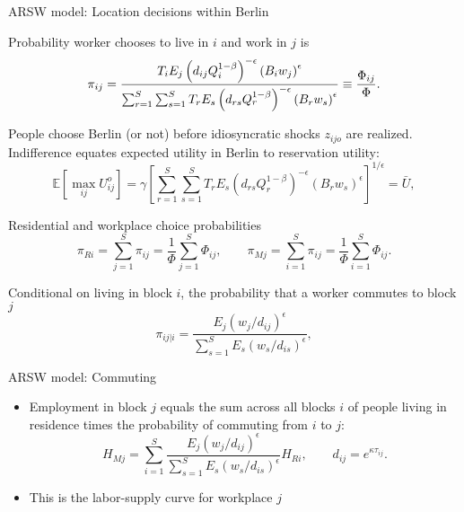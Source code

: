 \documentclass[11pt,notes=hide,aspectratio=169]{beamer}
\begin{document}
\begin{frame}{ARSW model: Location decisions within Berlin}
\begin{itemize}{\footnotesize
\item Probability worker chooses to live in $i$ and work in $j$ is
\begin{equation*} \label{eq:com_prob}
\pi _{ij}= \frac{T_{i} E_{j} \left( d_{ij}
Q_{i}^{1-\beta} \right)^{-\epsilon} \left( B_{i} w_{j} \right)^{\epsilon}}{%
\sum_{r=1}^{S} \sum_{s=1}^{S} T_{r} E_{s} \left( d_{rs} Q_{r}^{1-\beta}
\right)^{-\epsilon} \left( B_{r} w_{s} \right)^{\epsilon}} \equiv \frac{\Phi_{ij}}{\Phi} .
\end{equation*}
\item People choose Berlin (or not) before idiosyncratic shocks  $z_{ijo}$ are realized.
Indifference equates expected utility in Berlin to reservation utility:
\begin{equation*} \label{eq:pm}
\mathbb{E} \left[\max_{ij} U_{ij}^{o} \right]  = \gamma \left[ \sum_{r=1}^{S} \sum_{s=1}^{S} T_{r} E_{s} \left( d_{rs}
Q_{r}^{1-\beta} \right)^{-\epsilon} \left( B_{r} w_{s} \right)^{\epsilon} %
\right]^{1/\epsilon} = \bar{U},  
\end{equation*}
\item Residential and workplace choice probabilities
\begin{equation*} \label{eq:ch_prob}
\pi_{Ri} = \sum_{j=1}^{S} \pi_{ij} = \frac{1}{\Phi} \sum_{j=1}^{S} \Phi_{ij}, \qquad  \pi_{Mj} = \sum_{i=1}^{S} \pi_{ij} = \frac{1}{\Phi}\sum_{i=1}^{S} \Phi_{ij}.
\end{equation*}
\item Conditional on living in block $i$, the probability that a worker commutes to block $j$ %
\begin{equation*}
\pi _{ij|i}=\frac{ E_{j} \left( w_{j} / d_{ij} \right)^{\epsilon}}{
\sum_{s=1}^{S} E_{s} \left( w_{s} / d_{is} \right)^{\epsilon}},
\end{equation*}
}\end{itemize}
\end{frame}
\begin{frame}{ARSW model: Commuting }
\begin{itemize}
\item Employment in block $j$ equals the sum across all blocks $i$ of people living in residence times the probability of commuting from $i$ to $j$:
\begin{equation*} \label{eq:wbo}
H_{Mj}=\sum_{i=1}^{S} \frac{E_{j}\left(
w_{j}/d_{ij}\right) ^{\epsilon }}{\sum_{s=1}^{S}E_{s}\left( w_{s}/d_{is}\right)
^{\epsilon }} H_{Ri}, \qquad d_{ij} = e^{\kappa \tau_{ij}}.
\end{equation*} \smallskip
\item This is the labor-supply curve for workplace $j$
\end{itemize}
\end{frame}
\end{document}
